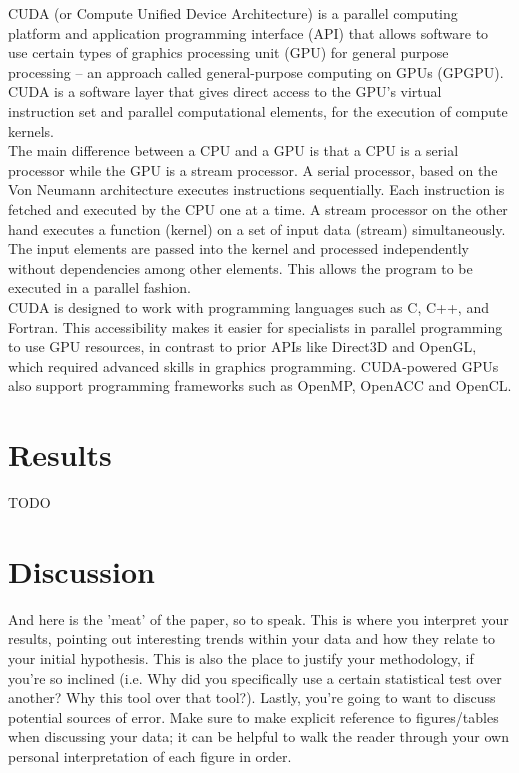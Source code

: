 \documentclass[10pt,twocolumn,letterpaper]{article}
\begin{document}
CUDA (or Compute Unified Device Architecture) is a parallel computing platform and application programming interface (API) that allows software to use certain types of graphics processing unit (GPU) for general purpose processing – an approach called general-purpose computing on GPUs (GPGPU). CUDA is a software layer that gives direct access to the GPU's virtual instruction set and parallel computational elements, for the execution of compute kernels. \\
The main difference between a CPU and a GPU is that a CPU is a serial processor while the GPU is a stream processor. A serial processor, based on the Von Neumann architecture executes instructions sequentially. Each instruction is fetched and executed by the CPU one at a time. A stream processor on the other hand executes a function (kernel) on a set of input data (stream) simultaneously. The input elements are passed into the kernel and processed independently without dependencies among other elements. This allows the program to be executed in a parallel fashion.\\
CUDA is designed to work with programming languages such as C, C++, and Fortran. This accessibility makes it easier for specialists in parallel programming to use GPU resources, in contrast to prior APIs like Direct3D and OpenGL, which required advanced skills in graphics programming. CUDA-powered GPUs also support programming frameworks such as OpenMP, OpenACC and OpenCL.


\section{Results}

TODO
\\




\section{Discussion}
And here is the 'meat' of the paper, so to speak. This is where you interpret your results, pointing out interesting trends within your data and how they relate to your initial hypothesis. This is also the place to justify your methodology, if you're so inclined (i.e. Why did you specifically use a certain statistical test over another? Why this tool over that tool?). Lastly, you're going to want to discuss potential sources of error. Make sure to make explicit reference to figures/tables when discussing your data; it can be helpful to walk the reader through your own personal interpretation of each figure in order.
\end{document}
